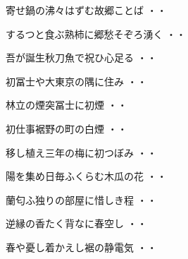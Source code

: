 \begin{shiika}寄せ鍋の沸々はずむ故郷ことば
\hfill{・・}\end{shiika}
\vspace{0.6cm}
\begin{shiika}するつと食ぶ熟柿に郷愁そぞろ湧く
\hfill{・・}\end{shiika}
\vspace{0.6cm}
\begin{shiika}吾が誕生秋刀魚で祝ひ心足る
\hfill{・・}\end{shiika}
\vspace{0.6cm}
\begin{shiika}初冨士や大東京の隅に住み
\hfill{・・}\end{shiika}
\vspace{0.6cm}
\begin{shiika}林立の煙突冨士に初煙
\hfill{・・}\end{shiika}
\vspace{0.6cm}
\begin{shiika}初仕事裾野の町の白煙
\hfill{・・}\end{shiika}
\vspace{0.6cm}
\begin{shiika}移し植え三年の梅に初つぼみ
\hfill{・・}\end{shiika}
\vspace{0.6cm}
\begin{shiika}陽を集め日毎ふくらむ木瓜の花
\hfill{・・}\end{shiika}
\vspace{0.6cm}
\begin{shiika}蘭匂ふ独りの部屋に惜しき程
\hfill{・・}\end{shiika}
\vspace{0.6cm}
\begin{shiika}逆縁の香たく背なに春空し
\hfill{・・}\end{shiika}
\vspace{0.6cm}
\begin{shiika}春や憂し着かえし裾の静電気
\hfill{・・}\end{shiika}
\vspace{0.6cm}
